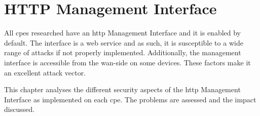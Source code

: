\section{HTTP Management Interface}
\label{section:http_mgt_iface}

All \glspl{cpe} researched have an \gls{http} Management Interface and it is enabled by default. The interface is a web service and as such, it is susceptible to a wide range of attacks if not properly implemented. Additionally, the management interface is accessible from the \gls{wan}-side on some devices. These factors make it an excellent attack vector.

This chapter analyses the different security aspects of the \gls{http} Management Interface as implemented on each \gls{cpe}. The problems are assessed and the impact discussed.





